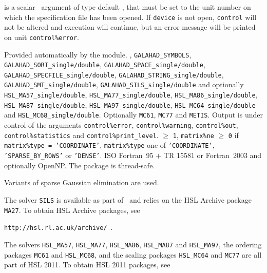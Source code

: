 \documentclass{galahad}
\begin{document}
\begin{description}

 is a scalar \intentin\ argument of type default \integer,
that must be set to the unit number on which the specification file
has been opened. If {\tt device} is not open, {\tt control} will
not be altered and execution will continue, but an error message
will be printed on unit {\tt control\%error}.

\end{description}


\galgeneral

\galworkspace Provided automatically by the module.
,
{\tt GALAHAD\_SYMBOLS},
{\tt GALAHAD\_SORT\_single/double},
{\tt GALAHAD\_SPACE\-\_single/double},
{\tt GALAHAD\_SPECFILE\_single/double},
{\tt GALAHAD\_STRING\_single/double},
{\tt GALAHAD\_SMT\-\_sin\-gle/double},
{\tt GALAHAD\_SILS\_single/double}
and optionally
{\tt HSL\_MA57\_single/double},
{\tt HSL\_MA77\_single/\-double},
{\tt HSL\_MA86\_single/double},
{\tt HSL\_MA87\_single/double},
{\tt HSL\_MA97\_single/double},
{\tt HSL\_MC64\_single\-/double} and
{\tt HSL\_MC68\_single\-/double}.
\galroutines Optionally {\tt MC61}, {\tt MC77} and {\tt METIS}.
\galio Output is under control of the arguments
{\tt control\%error},
{\tt control\%warning},
{\tt control\%out}, \\
{\tt control\-\%statistics}
and {\tt control\%print\_level}.
 $\geq$ {\tt 1},
{\tt matrix\%ne} $\geq$ {\tt 0} if
{\tt matrix\%type = 'COORDINATE'},
{\tt matrix\%type}
one of
{\tt 'COORDINATE'}, {\tt 'SPARSE\_BY\_ROWS'} or   {\tt 'DENSE'}.
\galportability ISO Fortran~95 + TR 15581 or Fortran~2003 and optionally OpenNP.
The package is thread-safe.


\galmethod
Variants of sparse Gaussian elimination are used.

\noindent
The solver {\tt SILS} is available as part of \galahad\ and relies on
the HSL Archive package {\tt MA27}. To obtain HSL Archive packages, see

{\tt http://hsl.rl.ac.uk/archive/ }.

\noindent
The solvers
{\tt HSL\_MA57},
{\tt HSL\_MA77},
{\tt HSL\_MA86},
{\tt HSL\_MA87}
and
{\tt HSL\_MA97}, the ordering packages
{\tt MC61} and {\tt HSL\_MC68}, and the scaling packages
{\tt HSL\_MC64} and {\tt MC77}
are all part of HSL 2011.
To obtain HSL 2011 packages, see
\end{document}
